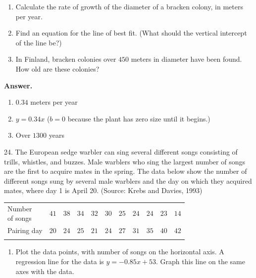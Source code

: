 \documentclass[10pt,]{book}
\makeatletter
\theoremstyle{plain}
\theoremstyle{definition}
\theoremstyle{definition}
\theoremstyle{definition}
\theoremstyle{definition}
\numberwithin{equation}{part}
\newcommand{\hrulethin}  {\noalign{\hrule height 0.04em}}
\newcommand{\tablecelllines}[3]%
{\begin{tabular}[#2]{@{}#1@{}}#3\end{tabular}}
\makeatother
\begin{document}
\begin{exerciselist}
 \leavevmode%
\begin{enumerate}[label=*\alph**]
\item\hypertarget{li-1441}{}Calculate the rate of growth of the diameter of a bracken colony, in meters per year.%
\item\hypertarget{li-1442}{}Find an equation for the line of best fit. (What should the vertical intercept of the line be?)%
\item\hypertarget{li-1443}{}In Finland, bracken colonies over \(450\) meters in diameter have been found. How old are these colonies?%
\end{enumerate}
%
\par\smallskip
\par\smallskip
\noindent\textbf{Answer.}\hypertarget{answer-213}{}\quad
\leavevmode%
\begin{enumerate}[label=*\alph**]
\item\hypertarget{li-1444}{}\(0.34\) meters per year%
\item\hypertarget{li-1445}{}\(y = 0.34x\) (\(b = 0\) because the plant has zero size until it begins.)%
\item\hypertarget{li-1446}{}Over \(1300\) years%
\end{enumerate}
%
\item[24.]\hypertarget{exercise-380}{}The European sedge warbler can sing several different songs consisting of trills, whistles, and buzzes. Male warblers who sing the largest number of songs are the first to acquire mates in the spring. The data below show the number of different songs sung by several male warblers and the day on which they acquired mates, where day 1 is April 20. (Source: Krebs and Davies, 1993) \leavevmode%
\begin{table}
\centering
\begin{tabular}{AlA}\hrulethin
\tablecelllines{l}{m}
{Number\\
of songs}
&\(41\)&\(38\)&\(34\)&\(32\)&\(30\)&\(25\)&\(24\)&\(24\)&\(23\)&\(14\)\tabularnewline\hrulethin
Pairing day&\(20\)&\(24\)&\(25\)&\(21\)&\(24\)&\(27\)&\(31\)&\(35\)&\(40\)&\(42\)\tabularnewline\hrulethin
\end{tabular}
\end{table}
 \leavevmode%
\begin{enumerate}[label=*\alph**]
\item\hypertarget{li-1447}{}Plot the data points, with number of songs on the horizontal axis. A regression line for the data is \(y = -0.85x + 53\). Graph this line on the same axes with the data.%

\end{enumerate}
\end{exerciselist}
\end{document}

